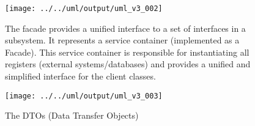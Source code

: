\documentclass[a4paper]{scrreprt}
\begin{document}
\begin{figure}[H]
    \begin{center}
        \texttt{[image: ../../uml/output/uml\_v3\_002]}
        \caption{The facade provides a unified interface to a
        set of interfaces in a subsystem.
        It represents a service container (implemented as a Facade).
        This service container is responsible for instantiating all registers (external systems/databases) and provides
        a unified and simplified interface for the client classes.
        }
        \label{fig:facade}
    \end{center}
\end{figure}

\begin{figure}[H]
    \begin{center}
        \texttt{[image: ../../uml/output/uml\_v3\_003]}
        \caption{The DTOs (Data Transfer Objects)}
        \label{fig:DTO}
    \end{center}
\end{figure}

\newpage

\listoflistings %
\printbibliography
\end{document}
